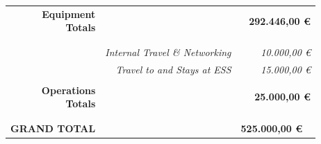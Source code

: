 \documentclass[12pt,a4paper,article]{report} %
\begin{document}
\begin{table}[htp]
\begin{center}
\begin{tabular}{r   r  r}
\makecell[r] {\textbf{Equipment} \\  \textbf{Totals}}&& \textbf{292.446,00   \euro{}}  \\ \\ \hline\hline \\


&{\footnotesize \emph{Internal Travel \& Networking}} & {\footnotesize \emph{10.000,00 \euro{}}}\\ 
&{\footnotesize \emph{Travel to and Stays at ESS}} & {\footnotesize \emph{15.000,00 \euro{} }}\\ \hline \\
\makecell[r] {\textbf{Operations} \\  \textbf{Totals}}&& \textbf{25.000,00   \euro{}}  \\ \\ \hline\hline \\
\textbf{GRAND TOTAL}&& \textbf{525.000,00 \euro{}}  \
\end{tabular}
\end{center}
\label{budget2022}
\end{table}%
			
			
\end{document}
